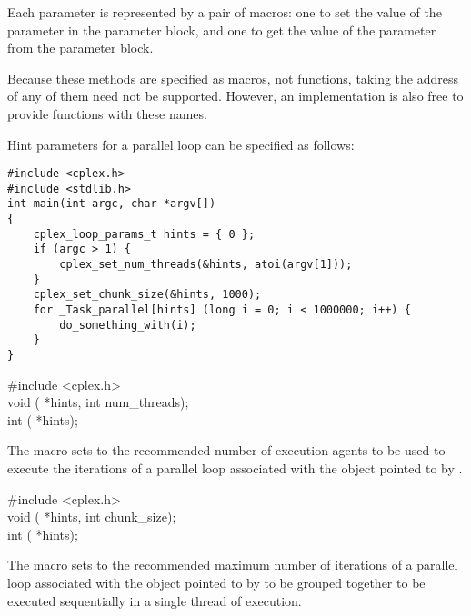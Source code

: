 \pnum
Each parameter is represented by a pair of macros:
one to set the value of the parameter in the parameter block,
and one to get the value of the parameter from the parameter block.

\begin{note}
Because these methods are specified as macros,
not functions,
taking the address of any of them need not be supported.
However, an implementation is also free
to provide functions with these names.
\end{note}

\begin{example}
Hint parameters for a parallel loop can be specified as follows:
\begin{verbatim}
#include <cplex.h>
#include <stdlib.h>
int main(int argc, char *argv[])
{
    cplex_loop_params_t hints = { 0 };
    if (argc > 1) {
        cplex_set_num_threads(&hints, atoi(argv[1]));
    }
    cplex_set_chunk_size(&hints, 1000);
    for _Task_parallel[hints] (long i = 0; i < 1000000; i++) {
        do_something_with(i);
    }
}
\end{verbatim}
\end{example}

\begin{ttfamily}
\#include <cplex.h>\\
void ( *hints, int num_threads);\\
int ( *hints);
\end{ttfamily}

\pnum
The
macro sets to
the recommended number of execution agents to be used
to execute the iterations of a parallel loop
associated with the object pointed to by
.

\begin{ttfamily}
\#include <cplex.h>\\
void ( *hints, int chunk_size);\\
int ( *hints);
\end{ttfamily}

\pnum
The
macro sets to
the recommended maximum number of iterations
of a parallel loop associated with the object pointed to by
to be grouped together to be executed sequentially
in a single thread of execution.

